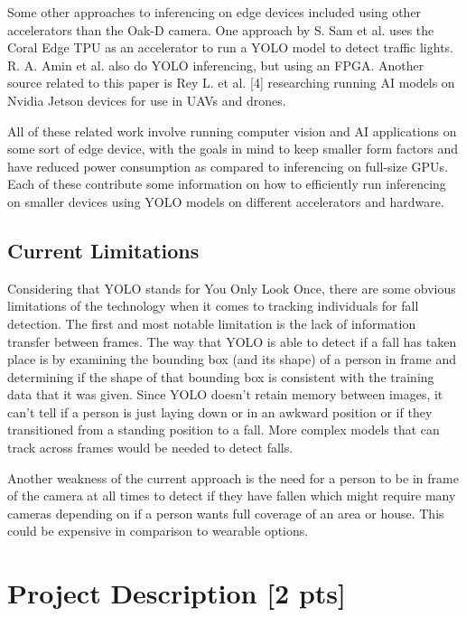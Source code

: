 \documentclass[sigconf,authorversion,nonacm]{acmart}
\begin{document}
Some other approaches to inferencing on edge devices included using other accelerators than the Oak-D camera. One approach by S. Sam et al. uses the Coral Edge TPU as an accelerator to run a YOLO model to detect traffic lights. R. A. Amin et al. also do YOLO inferencing, but using an FPGA. Another source related to this paper is Rey L. et al. [4] researching running AI models on Nvidia Jetson devices for use in UAVs and drones.

All of these related work involve running computer vision and AI applications on some sort of edge device, with the goals in mind to keep smaller form factors and have reduced power consumption as compared to inferencing on full-size GPUs. Each of these contribute some information on how to efficiently run inferencing on smaller devices using YOLO models on different accelerators and hardware.

\subsection{Current Limitations}

Considering that YOLO stands for You Only Look Once, there are some obvious limitations of the technology when it comes to tracking individuals for fall detection. The first and most notable limitation is the lack of information transfer between frames. The way that YOLO is able to detect if a fall has taken place is by examining the bounding box (and its shape) of a person in frame and determining if the shape of that bounding box is consistent with the training data that it was given. Since YOLO doesn’t retain memory between images, it can’t tell if a person is just laying down or in an awkward position or if they transitioned from a standing position to a fall. More complex models that can track across frames would be needed to detect falls. 

Another weakness of the current approach is the need for a person to be in frame of the camera at all times to detect if they have fallen which might require many cameras depending on if a person wants full coverage of an area or house. This could be expensive in comparison to wearable options.


\section{Project Description  {\small {[2 pts]}}}
\end{document}
